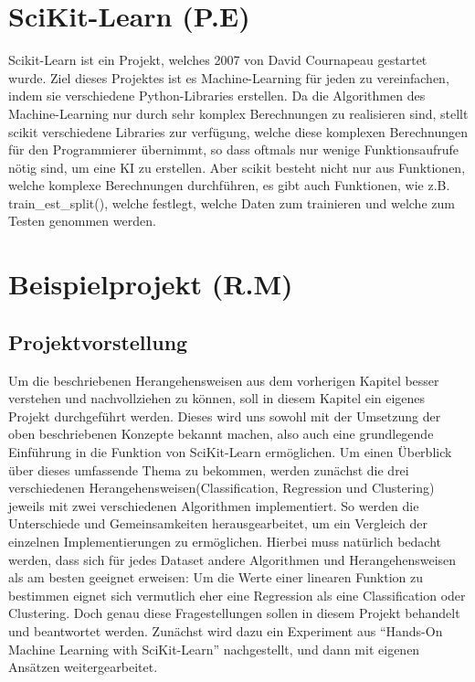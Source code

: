 \chapter{SciKit-Learn (P.E)}
\label{chap:sciKitLearn}
Scikit-Learn ist ein Projekt, welches 2007 von David Cournapeau gestartet wurde\cite{SKL}. Ziel dieses Projektes ist es Machine-Learning für jeden zu vereinfachen, indem sie verschiedene Python-Libraries erstellen. Da die Algorithmen des Machine-Learning nur durch sehr komplex Berechnungen zu realisieren sind, stellt scikit verschiedene Libraries zur verfügung, welche diese komplexen Berechnungen für den Programmierer übernimmt, so dass oftmals nur wenige Funktionsaufrufe nötig sind, um eine KI zu erstellen. Aber scikit besteht nicht nur aus Funktionen, welche komplexe Berechnungen durchführen, es gibt auch Funktionen, wie z.B. train\_est\_split(), welche festlegt, welche Daten zum trainieren und welche zum Testen genommen werden.

\chapter{Beispielprojekt (R.M)}
\label{chap:Beispielprojekt}

\section{Projektvorstellung}
\label{sec:projektvorstellung}
Um die beschriebenen Herangehensweisen aus dem vorherigen Kapitel besser verstehen und nachvollziehen zu können, soll in diesem Kapitel ein eigenes Projekt durchgeführt werden. Dieses wird uns sowohl mit der Umsetzung der oben beschriebenen Konzepte bekannt machen, also auch eine grundlegende Einführung in die Funktion von SciKit-Learn ermöglichen. 
Um einen Überblick über dieses umfassende Thema zu bekommen, werden zunächst die drei verschiedenen Herangehensweisen(Classification, Regression und Clustering) jeweils mit zwei verschiedenen Algorithmen implementiert. So werden die Unterschiede und Gemeinsamkeiten herausgearbeitet, um ein Vergleich der einzelnen Implementierungen zu ermöglichen. Hierbei muss natürlich bedacht werden, dass sich für jedes Dataset andere Algorithmen und Herangehensweisen als am besten geeignet erweisen: Um die Werte einer linearen Funktion zu bestimmen eignet sich vermutlich eher eine Regression als eine Classification oder Clustering. Doch genau diese Fragestellungen sollen in diesem Projekt behandelt und beantwortet werden.
Zunächst wird dazu ein Experiment aus “Hands-On Machine Learning with SciKit-Learn” nachgestellt, und dann mit eigenen Ansätzen weitergearbeitet.

